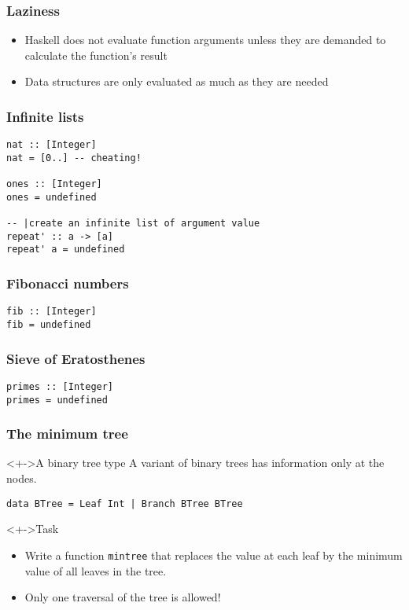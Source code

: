 \documentclass{beamer}
\subtitle{Laziness}
\begin{document}
\begin{frame}
  \titlepage
\end{frame}
\begin{frame}
  \frametitle{Laziness}
  \begin{itemize}
  \item Haskell does not evaluate function arguments unless they are
    demanded to calculate the function's result
  \item Data structures are only evaluated as much as they are needed
  \end{itemize}
\end{frame}

\begin{frame}[fragile]
  \frametitle{Infinite lists}
\begin{verbatim}
nat :: [Integer]
nat = [0..] -- cheating!

ones :: [Integer]
ones = undefined

-- |create an infinite list of argument value
repeat' :: a -> [a]
repeat' a = undefined
\end{verbatim}
\end{frame}

\begin{frame}[fragile]
  \frametitle{Fibonacci numbers}
\begin{verbatim}
fib :: [Integer]
fib = undefined
\end{verbatim}
\end{frame}
\begin{frame}[fragile]
  \frametitle{Sieve of Eratosthenes}
\begin{verbatim}
primes :: [Integer]
primes = undefined
\end{verbatim}
\end{frame}
\begin{frame}[fragile]
  \frametitle{The minimum tree}
  \begin{block}<+->{A binary tree type}
    A variant of binary trees has information only at the nodes.
\begin{verbatim}
data BTree = Leaf Int | Branch BTree BTree
\end{verbatim}
  \end{block}
  \begin{block}<+->{Task}
    \begin{itemize}
    \item<+-> Write a function \texttt{mintree} that replaces the value at
      each leaf by the minimum value of all leaves in the tree.
    \item<+-> \alert{Only one traversal of the tree is allowed! }
    \end{itemize}
  \end{block}
\end{frame}
\end{document}
